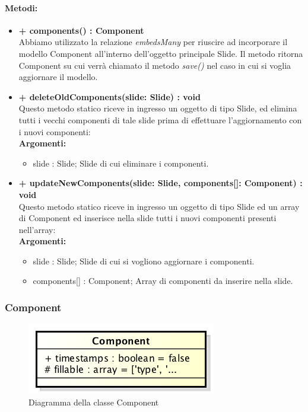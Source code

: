 	\paragraph{Metodi:}
	\begin{itemize}
		\item \textbf{+ components() : Component}\\
		Abbiamo utilizzato la relazione \textit{embedsMany} per riuscire ad incorporare il modello Component all'interno dell'oggetto principale Slide. Il metodo ritorna Component su cui verrà chiamato il metodo \textit{save()} nel caso in cui si voglia aggiornare il modello.
		\item \textbf{+ deleteOldComponents(slide: Slide) : void}\\
		Questo metodo statico riceve in ingresso un oggetto di tipo Slide, ed elimina tutti i vecchi componenti di tale slide prima di effettuare l'aggiornamento con i nuovi componenti:\\
		\textbf{Argomenti:}
		\begin{itemize}
			\item slide : Slide;
			Slide di cui eliminare i componenti.
		\end{itemize}
		\item \textbf{+ updateNewComponents(slide: Slide, components[]: Component) : void}\\
		Questo metodo statico riceve in ingresso un oggetto di tipo Slide ed un array di Component ed inserisce nella slide tutti i nuovi componenti presenti nell'array:\\
		\textbf{Argomenti:}
		\begin{itemize}
			\item slide : Slide;
			Slide di cui si vogliono aggiornare i componenti.
			\item components[] : Component;
			Array di componenti da inserire nella slide.
		\end{itemize}
	\end{itemize}
	\newpage
	

\subsubsection{Component}

	\begin{figure}[h]
		\centering
		\includegraphics[width=0.5\linewidth]{img/back_end_premi_model_component}
		\caption[Diagramma della classe Component]{Diagramma della classe Component}
		\label{fig:back_end_premi_model_component}
	\end{figure}


